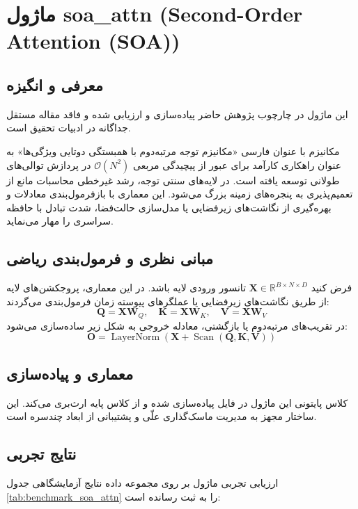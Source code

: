 \section{ماژول soa\_attn (Second-Order Attention (SOA))}
\label{sec:module_soa_attn}

\subsection{معرفی و انگیزه}
این ماژول در چارچوب پژوهش حاضر پیاده‌سازی و ارزیابی شده و فاقد مقاله مستقل جداگانه در ادبیات تحقیق است.

مکانیزم  با عنوان فارسی «مکانیزم توجه مرتبه‌دوم با همبستگی دوتایی ویژگی‌ها» به عنوان راهکاری کارآمد برای عبور از پیچیدگی مربعی $\mathcal{O}(N^2)$ در پردازش توالی‌های طولانی توسعه یافته است. در لایه‌های سنتی توجه، رشد غیرخطی محاسبات مانع از تعمیم‌پذیری به پنجره‌های زمینه بزرگ می‌شود. این معماری با بازفرمول‌بندی معادلات و بهره‌گیری از نگاشت‌های زیرفضایی یا مدل‌سازی حالت‌فضا، شدت تبادل با حافظه سراسری را مهار می‌نماید.

\subsection{مبانی نظری و فرمول‌بندی ریاضی}
فرض کنید $\mathbf{X} \in \mathbb{R}^{B \times N \times D}$ تانسور ورودی لایه باشد. در این معماری، پروجکشن‌های لایه از طریق نگاشت‌های زیرفضایی یا عملگرهای پیوسته زمان فرمول‌بندی می‌گردند:
 \begin{equation}
\mathbf{Q} = \mathbf{X} \mathbf{W}_Q, \quad \mathbf{K} = \mathbf{X} \mathbf{W}_K, \quad \mathbf{V} = \mathbf{X} \mathbf{W}_V
\end{equation}
در تقریب‌های مرتبه‌دوم یا بازگشتی، معادله خروجی به شکل زیر ساده‌سازی می‌شود:
 \begin{equation}
\mathbf{O} = \operatorname{LayerNorm}\left(\mathbf{X} + \operatorname{Scan}(\mathbf{Q}, \mathbf{K}, \mathbf{V})
\right)
\end{equation}

\subsection{معماری و پیاده‌سازی}
کلاس پایتونی این ماژول در فایل  پیاده‌سازی شده و از کلاس پایه  ارث‌بری می‌کند. این ساختار مجهز به مدیریت ماسک‌گذاری علّی و پشتیبانی از ابعاد چندسره است.

\subsection{نتایج تجربی}
ارزیابی تجربی ماژول  بر روی مجموعه داده  نتایج آزمایشگاهی جدول 
\ref{tab:benchmark_soa_attn} را به ثبت رسانده است:

